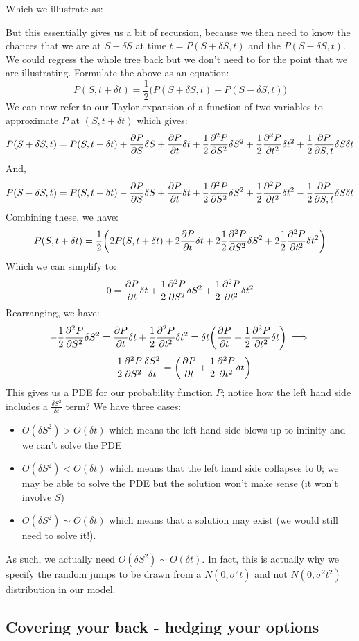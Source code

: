 \documentclass[../../Axiomathic.tex]{subfiles}
\begin{document}
Which we illustrate as:
\begin{center}

\end{center}
But this essentially gives us a bit of recursion, because we then need to know the chances that we are at $S+\delta S$ at time $t = P(S + \delta S, t)$ and the $P(S-\delta S, t)$. We could regress the whole tree back but we don't need to for the point that we are illustrating. Formulate the above as an equation:
\[P(S,t + \delta t) = \frac{1}{2}\biggl ( P(S + \delta S, t) + P(S - \delta S, t) \biggr ) \]
We can now refer to our Taylor expansion of a function of two variables to approximate $P$ at $(S, t+\delta t)$ which gives:
 \[ P(S + \delta S, t) = P(S, t + \delta t) + \frac{\partial P}{\partial S}\delta S + \frac{\partial P}{\partial t}\delta t +\frac{1}{2}\frac{\partial ^2P}{\partial S^2}\delta S^2+\frac{1}{2}\frac{\partial ^2P}{\partial t^2}\delta t^2+\frac{1}{2}\frac{\partial P}{\partial S,t}\delta S \delta t \]
 And,
 \[ P(S - \delta S, t) = P(S, t + \delta t) - \frac{\partial P}{\partial S}\delta S + \frac{\partial P}{\partial t}\delta t +\frac{1}{2}\frac{\partial ^2P}{\partial S^2}\delta S^2+\frac{1}{2}\frac{\partial ^2P}{\partial t^2}\delta t^2-\frac{1}{2}\frac{\partial P}{\partial S,t}\delta S \delta t \]
 Combining these, we have:
 \[P(S,t + \delta t) = \frac{1}{2}\biggl ( 2P(S, t + \delta t) +2\frac{\partial P}{\partial t}\delta t + 2\frac{1}{2}\frac{\partial ^2P}{\partial S^2}\delta S^2+2\frac{1}{2}\frac{\partial ^2P}{\partial t^2}\delta t^2 \biggr ) \]
 Which we can simplify to:
 \[0=\frac{\partial P}{\partial t}\delta t + \frac{1}{2}\frac{\partial ^2P}{\partial S^2}\delta S^2+\frac{1}{2}\frac{\partial ^2P}{\partial t^2}\delta t^2 \]
Rearranging, we have:
\[-\frac{1}{2}\frac{\partial ^2P}{\partial S^2}\delta S^2 = \frac{\partial P}{\partial t}\delta t +\frac{1}{2}\frac{\partial ^2P}{\partial t^2}\delta t^2 =\delta t \biggl ( \frac{\partial P}{\partial t}+\frac{1}{2}\frac{\partial ^2P}{\partial t^2}\delta t \biggr) \implies\]
\[-\frac{1}{2}\frac{\partial ^2P}{\partial S^2}\frac{\delta S^2}{\delta t}=\biggl ( \frac{\partial P}{\partial t}+\frac{1}{2}\frac{\partial ^2P}{\partial t^2}\delta t \biggr) \]
This gives us a PDE for our probability function $P$; notice how the left hand side includes a $\frac{\delta S^2}{\delta t}$ term? We have three cases:
\begin{itemize}
\item{ $O(\delta S^2) > O(\delta t)$ which means the left hand side blows up to infinity and we can't solve the PDE}
\item{$O(\delta S^2) < O(\delta t)$ which means that the left hand side collapses to 0; we may be able to solve the PDE but the solution won't make sense (it won't involve $S$)}
\item{$O(\delta S^2)\sim O(\delta t)$ which means that a solution may exist (we would still need to solve it!).}
\end{itemize}
As such, we actually need $O(\delta S^2) \sim O(\delta t)$. In fact, this is actually why we specify the random jumps to be drawn from a $N(0,\sigma^2t)$ and not $N(0,\sigma^2t^2)$ distribution in our model. 
\subsection{Covering your back - hedging your options}



			

  
\end{document}
